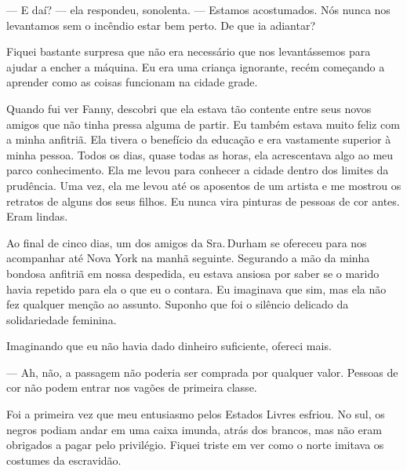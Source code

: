 --- E daí? --- ela respondeu,
sonolenta. --- Estamos acostumados. Nós nunca nos levantamos sem o
incêndio estar bem perto. De que ia adiantar?

Fiquei bastante surpresa que não era
necessário que nos levantássemos para ajudar a encher a máquina. Eu era
uma criança ignorante, recém começando a aprender como as coisas
funcionam na cidade grade.


Quando fui ver Fanny, descobri que ela
estava tão contente entre seus novos amigos que não tinha pressa alguma
de partir. Eu também estava muito feliz com a minha anfitriã. Ela tivera
o benefício da educação e era vastamente superior à minha pessoa. Todos
os dias, quase todas as horas, ela acrescentava algo ao meu parco
conhecimento. Ela me levou para conhecer a cidade dentro dos limites da
prudência. Uma vez, ela me levou até os aposentos de um artista e me
mostrou os retratos de alguns dos seus filhos. Eu nunca vira pinturas de
pessoas de cor antes. Eram lindas.

Ao final de cinco dias, um dos amigos
da Sra.\,Durham se ofereceu para nos acompanhar até Nova York na manhã
seguinte. Segurando a mão da minha bondosa anfitriã em nossa despedida,
eu estava ansiosa por saber se o marido havia repetido para ela o que eu
o contara. Eu imaginava que sim, mas ela não fez qualquer menção ao
assunto. Suponho que foi o silêncio delicado da solidariedade feminina.



Imaginando que eu não havia dado
dinheiro suficiente, ofereci mais.

--- Ah, não, a passagem não poderia ser comprada por qualquer valor.
Pessoas de cor não podem entrar nos vagões de primeira classe.

Foi a primeira vez que meu entusiasmo
pelos Estados Livres esfriou. No sul, os negros podiam andar em uma
caixa imunda, atrás dos brancos, mas não eram obrigados a pagar pelo
privilégio. Fiquei triste em ver como o norte imitava os costumes da
escravidão.

